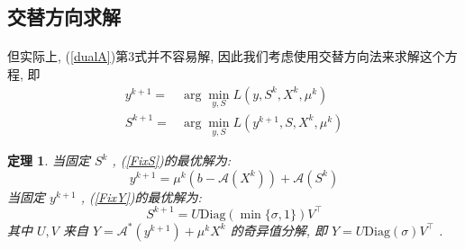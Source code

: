 \documentclass[a4paper, UTF8]{ctexart}
\newtheorem{theo}{\bf 定理}[section]
\numberwithin{equation}{section}  %
\begin{document}
		\subsection{交替方向求解}
			\paragraph{}
				\quad 但实际上, (\ref{dualA})第3式并不容易解, 因此我们考虑使用交替方向法来求解这个方程, 即
				\begin{align}
						y^{k + 1}
					=	& \arg \min_{y, S}L(y, S^k, X^k, \mu^k) \label{FixS}\\
						S^{k + 1}
					=	& \arg \min_{y, S}L(y^{k + 1}, S, X^k, \mu^k) \label{FixY}
				\end{align}
			
			\begin{theo}
				当固定 $S^k$ , (\ref{FixS})的最优解为:
					\begin{equation}\label{dualAY}
						y^{k + 1} = \mu^k(b - \mathcal{A}(X^k)) + \mathcal{A}(S^k)
					\end{equation}
				当固定 $y^{k + 1}$ , (\ref{FixY})的最优解为:
					\begin{equation}\label{dualAS}
						S^{k + 1} = U \text{Diag}(\min \{\sigma, 1\}) V^\top
					\end{equation}
				其中 $U, V$ 来自 $Y = \mathcal{A}^*(y^{k + 1}) + \mu^k X^k$ 的奇异值分解, 即 $Y = U \text{Diag}(\sigma) V^\top$ .
			\end{theo}
\end{document}
